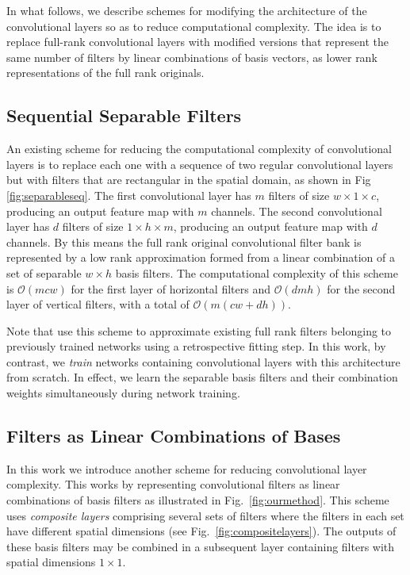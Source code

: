\documentclass[thesis]{subfiles}
\begin{document}
    In what follows, we describe schemes for modifying the architecture of the convolutional layers so as to reduce computational complexity. The idea is to replace full-rank convolutional layers with modified versions that represent the same number of filters by linear combinations of basis vectors, \ie as lower rank representations of the full rank originals.
    
    \subsection{Sequential Separable Filters}
    \label{seqsep}
    An existing scheme for reducing the computational complexity of convolutional layers \citep{journals/corr/JaderbergVZ14} is to replace each one with a sequence of two regular convolutional layers but with filters that are rectangular in the spatial domain, as shown in Fig \ref{fig:separableseq}. The first convolutional layer has $m$ filters of size $w \times 1 \times c$, producing an output feature map with $m$ channels. The second convolutional layer has $d$ filters of size $1 \times h \times m$, producing an output feature map with $d$ channels. By this means the full rank original convolutional filter bank is represented by a low rank approximation formed from a linear combination of a set of separable $w \times h$ basis filters.  The computational complexity of this scheme is $\mathcal{O}(m c w)$ for the first layer of horizontal filters and $\mathcal{O}(d m h)$ for the second layer of vertical filters, with a total of $\mathcal{O}(m(c w + d h))$.
    
    Note that \citet{journals/corr/JaderbergVZ14} use this scheme to approximate existing full rank filters belonging to previously trained networks using a retrospective fitting step. In this work, by contrast,  we {\em train} networks containing convolutional layers with this architecture from scratch. In effect, we learn the separable basis filters and their combination weights simultaneously during network training.
    
    
    \subsection{Filters as Linear Combinations of Bases}
    In this work we introduce another scheme for reducing convolutional layer complexity. This works by representing convolutional filters as linear combinations of basis filters as illustrated in Fig.~\ref{fig:ourmethod}. This scheme uses \emph{composite layers} comprising several sets of filters where the filters in each set have different spatial dimensions (see Fig.~\ref{fig:compositelayers}). The outputs of these basis filters may be combined in a subsequent layer containing filters with spatial dimensions $1 \times 1$.
    
\end{document}
